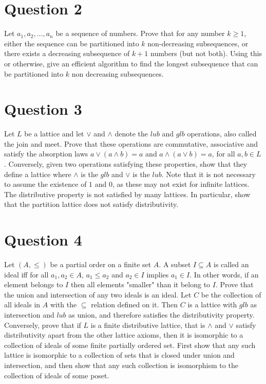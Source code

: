 \documentclass[12pt]{report}
\begin{document}
\section*{Question 2}
Let $a_{1}, a_{2}, \dots, a_{n}$ be a sequence of numbers. Prove that for any number $k \geq 1$, either the sequence can be partitioned into $k$ non-decreasing subsequences, or there exists a decreasing subsequence of $k + 1$ numbers (but not both). Using this or otherwise, give an efficient algorithm to find the longest subsequence that can be partitioned into $k$ non decreasing subsequences.
\section*{Question 3}
Let $L$ be a lattice and let $\lor$ and $\land$ denote the $lub$ and $glb$ operations, also called the join and meet. Prove that these operations are commutative, associative and satisfy the absorption laws $a \lor (a \land b) = a$ and $a \land (a \lor b) = a$, for all $a, b \in L$. Conversely, given two operations satisfying these properties, show that they define a lattice where $\land$ is the $glb$ and $\lor$ is the $lub$. Note that it is not necessary to assume the existence of $1$ and $0$, as these may not exist for infinite lattices. The distributive property is not satisfied by many lattices. In particular, show that the partition lattice does not satisfy distributivity.
\section*{Question 4}
Let $(A, \leq)$ be a partial order on a finite set $A$. A subset $I \subseteq A$ is called an ideal iff for all $a_{1}, a_{2} \in A$, $a_{1} \leq a_{2}$ and $a_{2} \in I$ implies $a_{1} \in I$. In other words, if an element belongs to $I$ then all elements "smaller" than it belong to $I$. Prove that the union and intersection of any two ideals is an ideal. Let $C$ be the collection of all ideals in $A$ with the $\subseteq$ relation defined on it. Then $C$ is a lattice with $glb$ as intersection and $lub$ as union, and therefore satisfies the distributivity property. Conversely, prove that if $L$ is a finite distributive lattice, that is $\land$ and $\lor$ satisfy distributivity apart from the other lattice axioms, then it is isomorphic to a collection of ideals of some finite partially ordered set. First show that any such lattice
is isomorphic to a collection of sets that is closed under union and intersection, and then show that any such collection is isomorphism to the collection of ideals of some poset.
\end{document}
